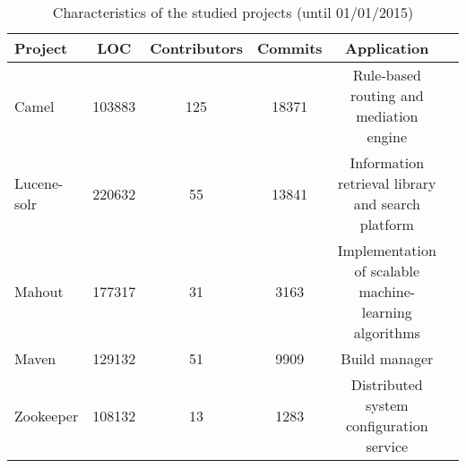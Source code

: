 \begin{table*}[ht]
\centering
\caption{Characteristics of the studied projects %
(until 01/01/2015)}
\label{tab:projects}
\footnotesize
\begin{tabular}{|l|c|c|c|c|c|}
\hline
\textbf{Project} & \textbf{LOC} & \textbf{Contributors} & \textbf{Commits} & \textbf{Application} \\%
\hline
Camel   & 103883  & 125 & 18371  & Rule-based routing and mediation engine \\
\hline
Lucene-solr & 220632 & 55 & 13841  & Information retrieval library and search platform\\
\hline
Mahout      & 177317 & 31 & 3163 &   Implementation of scalable machine-learning algorithms \\
\hline
Maven       & 129132 & 51 & 9909 &   Build manager \\
\hline
Zookeeper   & 108132 & 13  & 1283 &  Distributed system configuration service \\
\hline
\end{tabular}
\end{table*}
